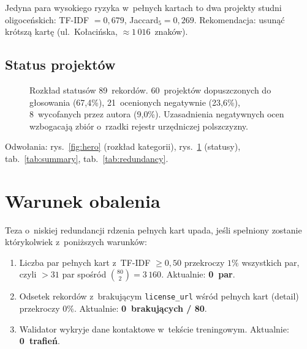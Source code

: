 Jedyna para wysokiego ryzyka w~pełnych kartach to dwa projekty studni
oligoceńskich: TF-IDF $= 0{,}679$, Jaccard$_5 = 0{,}269$.
Rekomendacja: usunąć krótszą kartę (ul.~Kołacińska, $\approx 1\,016$~znaków).

\subsection*{Status projektów}

\begin{figure}[h]
  \centering
  \caption{Rozkład statusów 89~rekordów. 60~projektów dopuszczonych
  do głosowania (67{,}4\%), 21~ocenionych negatywnie (23{,}6\%),
  8~wycofanych przez autora (9{,}0\%).
  Uzasadnienia negatywnych ocen wzbogacają zbiór o~rzadki rejestr
  urzędniczej polszczyzny.}
  \label{fig:status}
\end{figure}

Odwołania: rys.~\ref{fig:hero} (rozkład kategorii),
rys.~\ref{fig:status} (statusy), tab.~\ref{tab:summary},
tab.~\ref{tab:redundancy}.

\section{Warunek obalenia}

Teza o~niskiej redundancji rdzenia pełnych kart upada, jeśli
spełniony zostanie którykolwiek z~poniższych warunków:

\begin{enumerate}
  \item Liczba par pełnych kart z~TF-IDF $\ge 0{,}50$ przekroczy
        $1\%$ wszystkich par, czyli $> 31$ par spośród
        $\binom{80}{2} = 3\,160$. Aktualnie: \textbf{0~par}.
  \item Odsetek rekordów z~brakującym \texttt{license\_url}
        wśród pełnych kart (detail) przekroczy $0\%$.
        Aktualnie: \textbf{0~brakujących / 80}.
  \item Walidator wykryje dane kontaktowe w~tekście treningowym.
        Aktualnie: \textbf{0~trafień}.
\end{enumerate}

